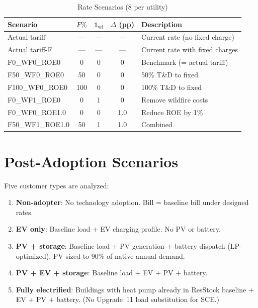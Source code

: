 \documentclass[11pt]{article}
\begin{document}
\begin{table}[htbp]
\centering
\caption{Rate Scenarios (8 per utility)}
\label{tab:scenarios}
\begin{tabular}{l c c c l}
\toprule
\textbf{Scenario} & \textbf{$F\%$} & \textbf{$\mathbb{1}_{\text{wf}}$} & \textbf{$\Delta$ (pp)} & \textbf{Description} \\
\midrule
Actual tariff & --- & --- & --- & Current rate (no fixed charge) \\
Actual tariff-F & --- & --- & --- & Current rate with fixed charges \\
F0\_WF0\_ROE0 & 0 & 0 & 0 & Benchmark (= actual tariff) \\
F50\_WF0\_ROE0 & 50 & 0 & 0 & 50\% T\&D to fixed \\
F100\_WF0\_ROE0 & 100 & 0 & 0 & 100\% T\&D to fixed \\
F0\_WF1\_ROE0 & 0 & 1 & 0 & Remove wildfire costs \\
F0\_WF0\_ROE1.0 & 0 & 0 & 1.0 & Reduce ROE by 1\% \\
F50\_WF1\_ROE1.0 & 50 & 1 & 1.0 & Combined \\
\bottomrule
\end{tabular}
\end{table}

\section{Post-Adoption Scenarios}

Five customer types are analyzed:

\begin{enumerate}
    \item \textbf{Non-adopter}: No technology adoption. Bill = baseline bill under designed rates.
    \item \textbf{EV only}: Baseline load $+$ EV charging profile. No PV or battery.
    \item \textbf{PV + storage}: Baseline load $+$ PV generation $+$ battery dispatch (LP-optimized). PV sized to 90\% of native annual demand.
    \item \textbf{PV + EV + storage}: Baseline load $+$ EV $+$ PV $+$ battery.
    \item \textbf{Fully electrified}: Buildings with heat pump already in ResStock baseline $+$ EV $+$ PV $+$ battery. (No Upgrade~11 load substitution for SCE.)
\end{enumerate}
\end{document}
